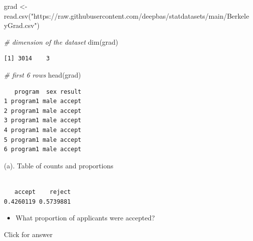 \documentclass[
]{book}
\newenvironment{Shaded}{\begin{snugshade}}{\end{snugshade}}
\newcommand{\CommentTok}[1]{\textcolor[rgb]{0.56,0.35,0.01}{\textit{#1}}}
\newcommand{\FunctionTok}[1]{\textcolor[rgb]{0.00,0.00,0.00}{#1}}
\newcommand{\NormalTok}[1]{#1}
\newcommand{\OtherTok}[1]{\textcolor[rgb]{0.56,0.35,0.01}{#1}}
\newcommand{\SpecialCharTok}[1]{\textcolor[rgb]{0.00,0.00,0.00}{#1}}
\newcommand{\StringTok}[1]{\textcolor[rgb]{0.31,0.60,0.02}{#1}}
\providecommand{\tightlist}{%
  \setlength{\itemsep}{0pt}\setlength{\parskip}{0pt}}
\begin{document}
\begin{Shaded}
\begin{Highlighting}[]
\NormalTok{grad }\OtherTok{\textless{}{-}} \FunctionTok{read.csv}\NormalTok{(}\StringTok{"https://raw.githubusercontent.com/deepbas/statdatasets/main/BerkeleyGrad.csv"}\NormalTok{)}
\end{Highlighting}
\end{Shaded}

\begin{Shaded}
\begin{Highlighting}[]
\CommentTok{\# dimension of the dataset}
\FunctionTok{dim}\NormalTok{(grad)}
\end{Highlighting}
\end{Shaded}

\begin{verbatim}
[1] 3014    3
\end{verbatim}

\begin{Shaded}
\begin{Highlighting}[]
\CommentTok{\# first 6 rows}
\FunctionTok{head}\NormalTok{(grad)}
\end{Highlighting}
\end{Shaded}

\begin{verbatim}
   program  sex result
1 program1 male accept
2 program1 male accept
3 program1 male accept
4 program1 male accept
5 program1 male accept
6 program1 male accept
\end{verbatim}

(a). Table of counts and proportions

\begin{Shaded}
\end{Shaded}

\begin{verbatim}

   accept    reject 
0.4260119 0.5739881 
\end{verbatim}

\begin{itemize}
\tightlist
\item
  What proportion of applicants were accepted?
\end{itemize}

Click for answer
\end{document}
